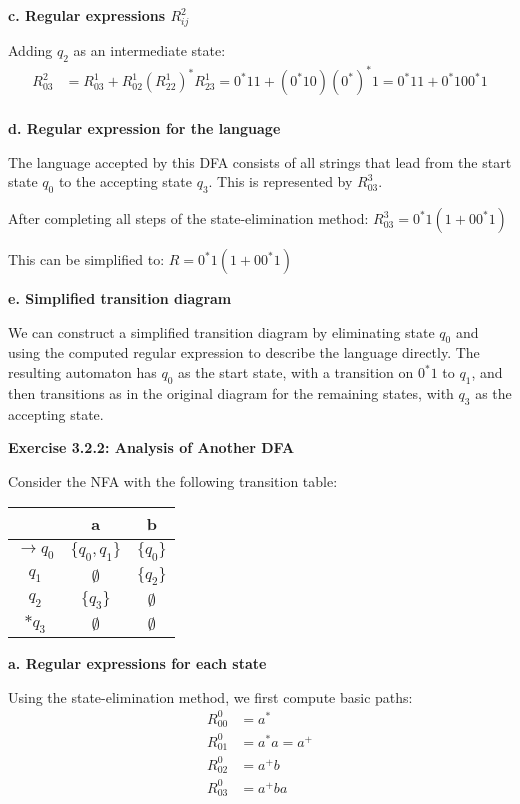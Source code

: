 \documentclass{article}
\theoremstyle{theorem}
\theoremstyle{definition}
\theoremstyle{remark}
\begin{document}
\textbf{c. Regular expressions $R^2_{ij}$}

Adding $q_2$ as an intermediate state:
\begin{align*}
R^2_{03} &= R^1_{03} + R^1_{02}(R^1_{22})^*R^1_{23} = 0^*11 + (0^*10)(0^*)^*1 = 0^*11 + 0^*100^*1 \\
\end{align*}

\textbf{d. Regular expression for the language}

The language accepted by this DFA consists of all strings that lead from the start state $q_0$ to the accepting state $q_3$. This is represented by $R^3_{03}$.

After completing all steps of the state-elimination method:
$R^3_{03} = 0^*1(1+00^*1)$

This can be simplified to:
$R = 0^*1(1+00^*1)$

\textbf{e. Simplified transition diagram}

We can construct a simplified transition diagram by eliminating state $q_0$ and using the computed regular expression to describe the language directly. The resulting automaton has $q_0$ as the start state, with a transition on $0^*1$ to $q_1$, and then transitions as in the original diagram for the remaining states, with $q_3$ as the accepting state.

\textbf{Exercise 3.2.2: Analysis of Another DFA}

Consider the NFA with the following transition table:
\begin{center}
\begin{tabular}{c|cc}
 & a & b \\ \hline
$\to q_0$ & $\{q_0,q_1\}$ & $\{q_0\}$ \\
$q_1$ & $\emptyset$ & $\{q_2\}$ \\
$q_2$ & $\{q_3\}$ & $\emptyset$ \\
$*q_3$ & $\emptyset$ & $\emptyset$ \\
\end{tabular}
\end{center}

\textbf{a. Regular expressions for each state}

Using the state-elimination method, we first compute basic paths:
\begin{align*}
R^0_{00} &= a^* \\
R^0_{01} &= a^*a = a^+ \\
R^0_{02} &= a^+b \\
R^0_{03} &= a^+ba \\
\end{align*}
\end{document}
